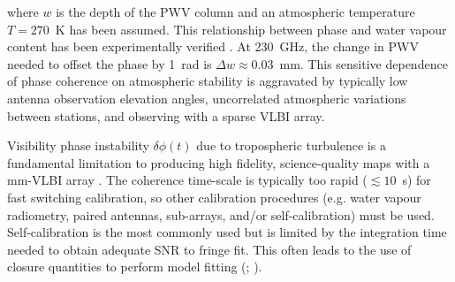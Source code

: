 \noindent where $w$ is the depth of the PWV column \citep*{Carilli_1999} and an atmospheric temperature $T=270$~K has been assumed. This relationship between phase and water vapour content has been experimentally verified \cite{hogg_1981}. At 230~GHz, the change in PWV needed to offset the phase by 1~rad is $\Delta w\approx0.03$~mm. This sensitive dependence of phase coherence on atmospheric stability is aggravated by typically low antenna observation elevation angles, uncorrelated atmospheric variations between stations, and observing with a sparse VLBI array.

Visibility phase instability  $\delta \phi(t)$ due to tropospheric turbulence is a fundamental limitation to producing high fidelity, science-quality maps with a mm-VLBI array \citep{Thompson_2001}. The coherence time-scale is typically too rapid ($\lesssim10$~s) for fast switching calibration, so other calibration procedures (e.g. water vapour radiometry, paired antennas, sub-arrays, and/or self-calibration) must be used. Self-calibration is the most commonly used but is limited by the integration time needed to obtain adequate SNR to fringe fit. This often leads to the use of closure quantities to perform model fitting (\citealt{Doeleman_2001}; \citealt{Fish_2011}).

